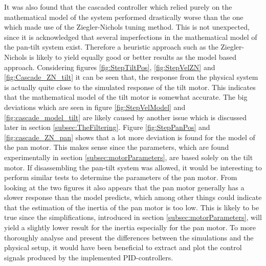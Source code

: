 \documentclass[../../main.tex]{subfiles}
\begin{document}
It was also found that the cascaded controller which relied purely on the mathematical model of the system performed drastically worse than the one which made use of the Ziegler-Nichols tuning method. This is not unexpected, since it is acknowledged that several imperfections in the mathematical model of the pan-tilt system exist. Therefore a heuristic approach such as the Ziegler-Nichols is likely to yield equally good or better results as the model based approach. Considering figures \ref{fig:StepTiltPos}, \ref{fig:StepVelZN} and \ref{fig:Cascade_ZN_tilt} it can be seen that, the response from the physical system is actually quite close to the simulated response of the tilt motor. This indicates that the mathematical model of the tilt motor is somewhat accurate. The big deviations which are seen in figure \ref{fig:StepVelModel} and \ref{fig:cascade_model_tilt} are likely caused by another issue which is discussed later in section \ref{subsec:TheFiltering}. Figure \ref{fig:StepPanPos} and \ref{fig:cascade_ZN_pan} shows that a lot more deviation is found for the model of the pan motor. This makes sense since the parameters, which are found experimentally in section \ref{subsec:motorParameters}, are based solely on the tilt motor. If disassembling the pan-tilt system was allowed, it would be interesting to perform similar tests to determine the parameters of the pan motor. From looking at the two figures it also appears that the pan motor generally has a slower response than the model predicts, which among other things could indicate that the estimation of the inertia of the pan motor is too low. This is likely to be true since the simplifications, introduced in section \ref{subsec:motorParameters}, will yield a slightly lower result for the inertia especially for the pan motor. To more thoroughly analyse and present the differences between the simulations and the physical setup, it would have been beneficial to extract and plot the control signals produced by the implemented PID-controllers.



\end{document}
